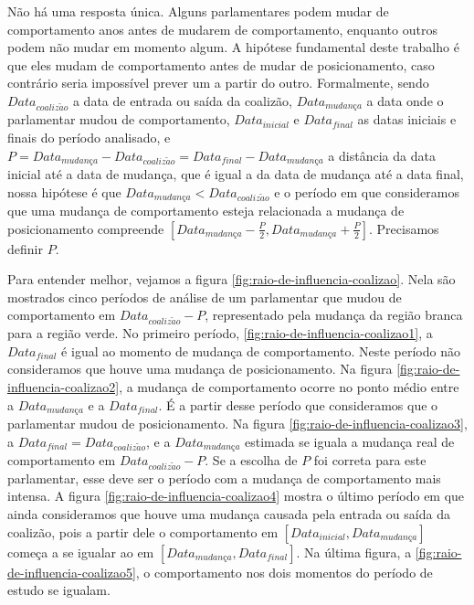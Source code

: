 \documentclass[a4paper,titlepage]{ppgi}\usepackage[]{graphicx}\usepackage[]{color}
\begin{document}
Não há uma resposta única. Alguns parlamentares podem mudar de comportamento
anos antes de mudarem de comportamento, enquanto outros podem não mudar em
momento algum. A hipótese fundamental deste trabalho é que eles mudam de
comportamento antes de mudar de posicionamento, caso contrário seria impossível
prever um a partir do outro. Formalmente, sendo $Data_{coaliz\tilde{a}o}$ a
data de entrada ou saída da coalizão, $Data_{mudan\textit{\c{c}}a}$ a data onde
o parlamentar mudou de comportamento, $Data_{inicial}$ e $Data_{final}$ as
datas iniciais e finais do período analisado, e $P =
Data_{mudan\textit{\c{c}}a} - Data_{coaliz\tilde{a}o} = Data_{final} -
Data_{mudan\textit{\c{c}}a}$ a distância da data inicial até a data de mudança,
que é igual a da data de mudança até a data final, nossa hipótese é que
$Data_{mudan\textit{\c{c}}a} < Data_{coaliz\tilde{a}o}$ e o período em que
consideramos que uma mudança de comportamento esteja relacionada a mudança de
posicionamento compreende $\left[Data_{mudan\textit{\c{c}}a} - \frac{P}{2},
Data_{mudan\textit{\c{c}}a} + \frac{P}{2}\right]$. Precisamos definir $P$.

Para entender melhor, vejamos a figura \ref{fig:raio-de-influencia-coalizao}.
Nela são mostrados cinco períodos de análise de um parlamentar que mudou de
comportamento em $Data_{coaliz\tilde{a}o} - P$, representado pela mudança da
região branca para a região verde. No primeiro período,
\ref{fig:raio-de-influencia-coalizao1}, a $Data_{final}$ é igual ao momento de
mudança de comportamento. Neste período não consideramos que houve uma mudança
de posicionamento. Na figura \ref{fig:raio-de-influencia-coalizao2}, a mudança
de comportamento ocorre no ponto médio entre a $Data_{mudan\textit{\c{c}}a}$ e
a $Data_{final}$.  É a partir desse período que consideramos que o parlamentar
mudou de posicionamento. Na figura \ref{fig:raio-de-influencia-coalizao3}, a
$Data_{final} = Data_{coaliz\tilde{a}o}$, e a $Data_{mudan\textit{\c{c}}a}$
estimada se iguala a mudança real de comportamento em $Data_{coaliz\tilde{a}o}
- P$. Se a escolha de $P$ foi correta para este parlamentar, esse deve ser o
período com a mudança de comportamento mais intensa. A figura
\ref{fig:raio-de-influencia-coalizao4} mostra o último período em que ainda
consideramos que houve uma mudança causada pela entrada ou saída da coalizão,
pois a partir dele o comportamento em $\left[Data_{inicial},
Data_{mudan\textit{\c{c}}a}\right]$ começa a se igualar ao em
$\left[Data_{mudan\textit{\c{c}}a}, Data_{final}\right]$. Na última figura, a
\ref{fig:raio-de-influencia-coalizao5}, o comportamento nos dois momentos do
período de estudo se igualam.
\end{document}
